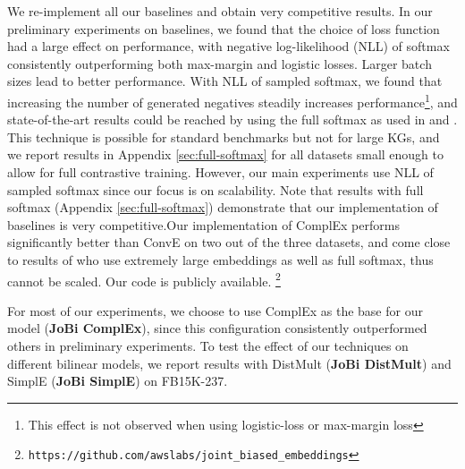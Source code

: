 \documentclass[11pt,a4paper, dvipsnames]{article}
\begin{document}
We re-implement all our baselines and obtain very competitive results. In our preliminary experiments on baselines, we found that the choice of loss function had a large effect on performance, with negative log-likelihood (NLL) of softmax consistently outperforming both max-margin and logistic losses. Larger batch sizes lead to better performance. With NLL of sampled softmax, we found that increasing the number of generated negatives steadily increases performance\footnote{This effect is not observed when using logistic-loss or max-margin loss}, and state-of-the-art results could be reached by using the full softmax as used in \citet{Joulin2017FastEmbeddings} and \citet{Lacroix2018CanonicalCompletion}. This technique is possible for standard benchmarks but not for large KGs, and we report results in Appendix \ref{sec:full-softmax} 
for all datasets small enough to allow for full contrastive training. However, our main experiments use NLL of sampled softmax since our focus is on scalability. Note that results with full softmax (Appendix \ref{sec:full-softmax}) demonstrate that our implementation of baselines is very competitive.Our implementation of ComplEx performs significantly better than ConvE \citep{Dettmers2018ConvolutionalEmbeddings} on two out of the three datasets, and come close to results of \citet{Lacroix2018CanonicalCompletion} who use extremely large embeddings as well as full softmax, thus cannot be scaled. Our code is publicly available. \footnote{\tiny{{\tt  https://github.com/awslabs/joint\_biased\_embeddings}}}

For most of our experiments, we choose to use ComplEx as the base for our model (\textbf{JoBi ComplEx}), since this configuration consistently outperformed others in preliminary experiments. To test the effect of our techniques on different bilinear models, we report results with DistMult (\textbf{JoBi DistMult}) and SimplE (\textbf{JoBi SimplE}) on FB15K-237. 
\end{document}

